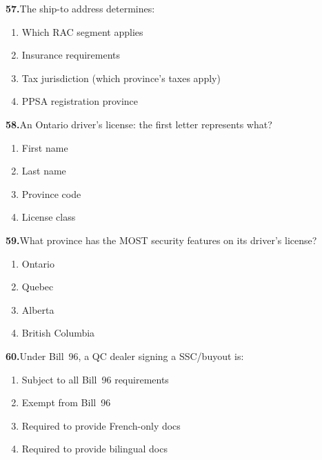\documentclass[11pt,letterpaper]{article}
\newif\ifshowsolutions
\newcommand{\answer}[1]{%
  \ifshowsolutions
    \begin{tcolorbox}[colback=green!5!white, colframe=answergreen, title={\small\textbf{Answer}}, fonttitle=\color{white}, coltitle=white, colbacktitle=answergreen, boxrule=0.5pt, arc=2pt, left=4pt, right=4pt, top=2pt, bottom=2pt]
    {\small #1}
    \end{tcolorbox}
  \fi
}
\begin{document}
\vspace{0.5em}

\noindent\textbf{57.}\quad The ship-to address determines:

\begin{enumerate}[label=\Alph*), leftmargin=2em, itemsep=0pt]
\item Which RAC segment applies
\item Insurance requirements
\item Tax jurisdiction (which province's taxes apply)
\item PPSA registration province
\end{enumerate}
\answer{C) Tax jurisdiction. Wrong ship-to = wrong taxes.}

\vspace{0.5em}

\noindent\textbf{58.}\quad An Ontario driver's license: the first letter represents what?

\begin{enumerate}[label=\Alph*), leftmargin=2em, itemsep=0pt]
\item First name
\item Last name
\item Province code
\item License class
\end{enumerate}
\answer{B) Last name initial. Last 6 digits = YYMMDD (females add 50 to month).}

\vspace{0.5em}

\noindent\textbf{59.}\quad What province has the MOST security features on its driver's license?

\begin{enumerate}[label=\Alph*), leftmargin=2em, itemsep=0pt]
\item Ontario
\item Quebec
\item Alberta
\item British Columbia
\end{enumerate}
\answer{C) Alberta: Albertosaurus, 3 transparent windows, rainbow printing.}

\vspace{0.5em}

\noindent\textbf{60.}\quad Under Bill~96, a QC dealer signing a SSC/buyout is:

\begin{enumerate}[label=\Alph*), leftmargin=2em, itemsep=0pt]
\item Subject to all Bill~96 requirements
\item Exempt from Bill~96
\item Required to provide French-only docs
\item Required to provide bilingual docs
\end{enumerate}
\answer{B) Exempt from Bill~96. QC dealers signing SSC or buyout are the exception.}
\end{document}
